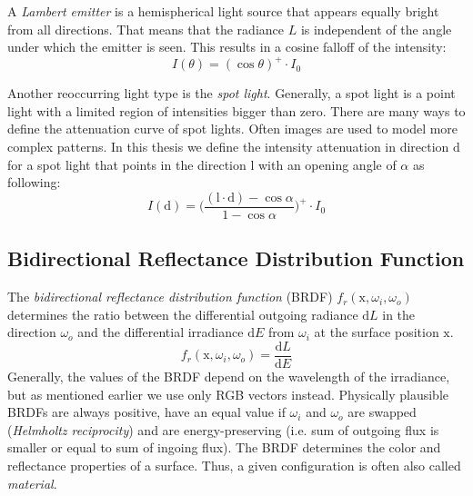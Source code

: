 \documentclass[thesis.tex]{subfiles}
\begin{document}
A \emph{Lambert emitter} is a hemispherical light source that appears equally bright from all directions.
That means that the radiance $L$ is independent of the angle under which the emitter is seen.
This results in a cosine falloff of the intensity: %
\begin{equation}
I(\theta) = (\cos\theta)^+ \cdot I_0
\end{equation}

Another reoccurring light type is the \emph{spot light}.
Generally, a spot light is a point light with a limited region of intensities bigger than zero.
There are many ways to define the attenuation curve of spot lights.
Often images are used to model more complex patterns.
In this thesis we define the intensity attenuation in direction $\mathrm{d}$ for a spot light that points in the direction $\mathrm{l}$ with an opening angle of $\alpha$ as following:
\begin{equation}
I(\mathrm{d}) = \Big(\frac{(\mathrm{l} \cdot \mathrm{d}) - \cos\alpha }{1-\cos\alpha}\Big)^+ \cdot I_0
\end{equation}

\subsection{Bidirectional Reflectance Distribution Function}\label{sec:preq:brdf}
The \emph{bidirectional reflectance distribution function} (BRDF) $f_r(\mathrm{x}, \omega_i, \omega_o)$ determines the ratio between the differential outgoing radiance $\mathrm{d}L$ in the direction $\omega_o$ and the differential irradiance $\mathrm{d}E$ from $\omega_i$ at the surface position $\mathrm{x}$.
\begin{equation}
f_r(\mathrm{x}, \omega_i, \omega_o) = \frac{\mathrm{d}L}{\mathrm{d}E}
\end{equation}
Generally, the values of the BRDF depend on the wavelength of the irradiance, but as mentioned earlier we use only RGB vectors instead.
Physically plausible BRDFs are always positive, have an equal value if $\omega_i$ and $\omega_o$ are swapped (\emph{Helmholtz reciprocity}) and are energy-preserving (i.e. sum of outgoing flux is smaller or equal to sum of ingoing flux).
The BRDF determines the color and reflectance properties of a surface.
Thus, a given configuration is often also called \emph{material}.
\end{document}
